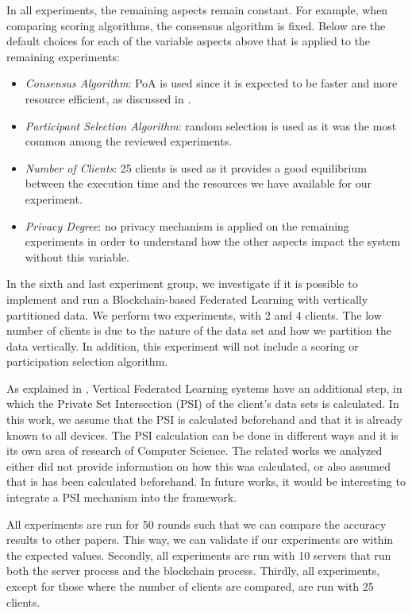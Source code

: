 In all experiments, the remaining aspects remain constant. For example, when comparing scoring algorithms, the consensus algorithm is fixed. Below are the default choices for each of the variable aspects above that is applied to the remaining experiments:

\begin{itemize}
    \item \textit{Consensus Algorithm}: PoA is used since it is expected to be faster and more resource efficient, as discussed in .
    
    \item \textit{Participant Selection Algorithm}: random selection is used as it was the most common among the reviewed experiments.
    
    \item \textit{Number of Clients}: 25 clients is used as it provides a good equilibrium between the execution time and the resources we have available for our experiment.
    
    \item \textit{Privacy Degree}: no privacy mechanism is applied on the remaining experiments in order to understand how the other aspects impact the system without this variable.
\end{itemize}

In the sixth and last experiment group, we investigate if it is possible to implement and run a Blockchain-based Federated Learning with vertically partitioned data. We perform two experiments, with 2 and 4 clients. The low number of clients is due to the nature of the data set and how we partition the data vertically. In addition, this experiment will not include a scoring or participation selection algorithm.

As explained in , Vertical Federated Learning systems have an additional step, in which the Private Set Intersection (PSI) of the client's data sets is calculated. In this work, we assume that the PSI is calculated beforehand and that it is already known to all devices. The PSI calculation can be done in different ways and it is its own area of research of Computer Science. The related works we analyzed either did not provide information on how this was calculated, or also assumed that is has been calculated beforehand. In future works, it would be interesting to integrate a PSI mechanism into the framework.

All experiments are run for 50 rounds such that we can compare the accuracy results to other papers. This way, we can validate if our experiments are within the expected values. Secondly, all experiments are run with 10 servers that run both the server process and the blockchain process. Thirdly, all experiments, except for those where the number of clients are compared, are run with 25 clients.

